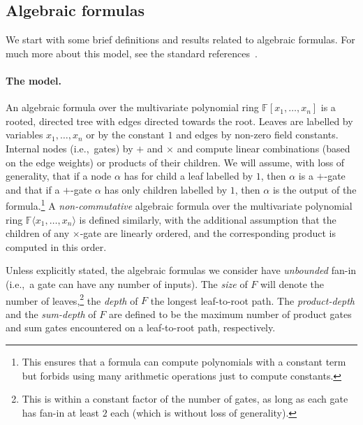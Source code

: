 \documentclass[11pt,a4paper]{article}
\newcommand{\F}{\mathbb{F}}
\newcommand{\comment}[2]{\marginpar{\tiny{\textbf{#1: }\textit{#2}}}}
\newcommand{\gm}[1]{\comment{GM}{#1}}
\begin{document}
\subsection{Algebraic formulas} 
\label{sec:formula-prelims}

We start with some brief definitions and results related to algebraic formulas. For much more about this model, see the standard references~\cite{SY,Ramprasadsurvey}.

\paragraph{The model.} An algebraic formula over the multivariate polynomial ring $\F[x_1,\ldots,x_n]$ is a rooted, directed tree with edges directed towards the root. Leaves are labelled by variables $x_1,\ldots,x_n$ or by the constant \(1\) and edges by non-zero field constants. Internal nodes (i.e.,~gates) by $+$ and $\times$ and compute linear combinations (based on the edge weights) or products of their children. We will assume, with loss of generality, that if a node \(\alpha\) has for child a leaf labelled by \(1\), then \(\alpha\)  is a \(+\)-gate and that if a \(+\)-gate \(\alpha\) has only children labelled by \(1\), then \(\alpha\) is the output of the formula.\footnote{This ensures that a formula can compute polynomials with a constant term but forbids using many arithmetic operations just to compute constants.}
A \emph{non-commutative} algebraic formula  over the multivariate polynomial ring $\F\langle x_1,\ldots,x_n\rangle$ is defined similarly, with the additional assumption that the children of any $\times$-gate are linearly ordered, and the corresponding product is computed in this order.

Unless explicitly stated, the algebraic formulas we consider have \emph{unbounded} fan-in (i.e.,~a gate can have any number of inputs). The \emph{size} of $F$ will denote the number of leaves,\footnote{\label{ft:fanin}This is within a constant factor of the number of gates, as long as each gate has fan-in at least $2$ each (which is without loss of generality).} the \emph{depth} of $F$ the longest leaf-to-root path. The \emph{product-depth} and the \emph{sum-depth} of $F$ are defined to be the maximum number of product gates and sum gates encountered on a leaf-to-root path, respectively.
\end{document}
